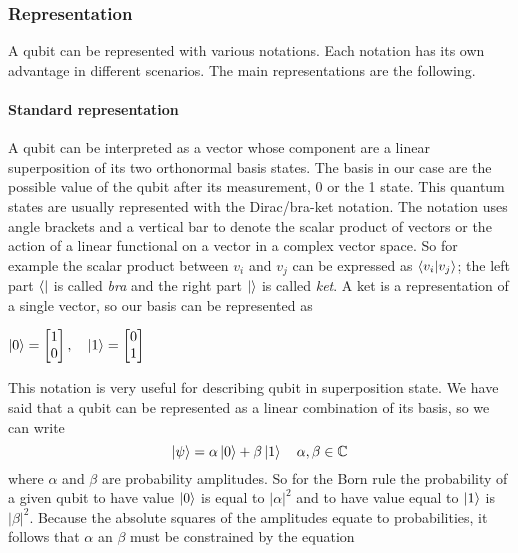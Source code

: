 \documentclass[main.tex]{subfiles}
\begin{document}
		\subsubsection{Representation}
		A qubit can be represented with various notations. Each notation has its own advantage in different scenarios. 
		The main representations are the following.
		\paragraph{Standard representation}
		A qubit can be interpreted as a vector whose component are a linear superposition of its two orthonormal basis states. 
		The	basis in our case are the possible value of the qubit after its measurement, 0 or the 1 state. 
		This quantum states are usually represented with the Dirac/bra-ket notation.
		The notation uses angle brackets and a vertical bar to denote the scalar product of vectors or the action of a linear 
		functional on a vector in a complex vector space. So for example the scalar product between $v_i$ and $v_j$ can be expressed
	 	as $\braket{v_i|v_j}$; the left part $\bra{}$ is called \textit{bra} and the right part $\ket{}$ is called \textit{ket}. A
	 	ket is a representation of a single vector, so our basis can be represented as 
		\begin{center}
		$\ket{0} = 
		\begin{bmatrix}
           1 \\
           0
        \end{bmatrix},\quad
        \ket{1} = 
		\begin{bmatrix}
           0 \\
           1
        \end{bmatrix}$
		\end{center}
       	This notation is very useful for describing qubit in superposition state. We have said that a qubit can be 
        represented as a linear combination of its basis, so we can write 
      	\begin{equation}
        \ket{\psi}=\alpha\ket{0}+\beta\ket{1} 
        \quad \alpha, \beta \in \mathbb{C}
        \end{equation}
        where $\alpha$ and $\beta$ are probability amplitudes. So for the Born rule the probability of a given qubit to have 
        value $\ket{0}$ is equal to $|\alpha|^2$
        and to have value equal to $\ket{1}$ is $|\beta|^2$. Because the absolute squares of the amplitudes equate to probabilities,
        it follows that $\alpha$ an $\beta$ must be constrained by the equation
\end{document}
